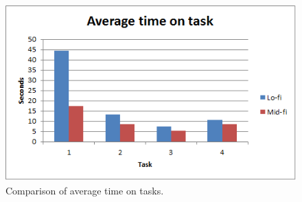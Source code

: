 \begin{figure}[H]
\centering
\includegraphics[width=.7\textwidth]{billeder/AverageTime}
\caption{Comparison of average time on tasks.}
\end{figure}

